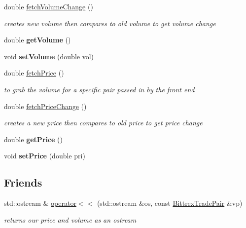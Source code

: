\begin{DoxyCompactItemize}
double \mbox{\hyperlink{class_bittrex_trade_pair_afd555c5ae36025d25964350c50f1006a}{fetch\+Volume\+Change}} ()
\begin{DoxyCompactList}\small\item\em creates new volume then compares to old volume to get volume change \end{DoxyCompactList}\item 
\mbox{\label{class_bittrex_trade_pair_ac3e959d5d6aa90c9126e8f31c1b8d6f8}} 
double {\bfseries get\+Volume} ()
\item 
\mbox{\label{class_bittrex_trade_pair_a40f9c9ff6618e1a170820bd60daeaa0f}} 
void {\bfseries set\+Volume} (double vol)
\item 
double \mbox{\hyperlink{class_bittrex_trade_pair_a74564273a0a56f63a8737fbb4b0dc2e5}{fetch\+Price}} ()
\begin{DoxyCompactList}\small\item\em to grab the volume for a specific pair passed in by the front end \end{DoxyCompactList}\item 
\mbox{\label{class_bittrex_trade_pair_add7f130337294db2b56ce2fbcc669c90}} 
double \mbox{\hyperlink{class_bittrex_trade_pair_add7f130337294db2b56ce2fbcc669c90}{fetch\+Price\+Change}} ()
\begin{DoxyCompactList}\small\item\em creates a new price then compares to old price to get price change \end{DoxyCompactList}\item 
\mbox{\label{class_bittrex_trade_pair_af0a18d8b1cc841b657a474ea071e9778}} 
double {\bfseries get\+Price} ()
\item 
\mbox{\label{class_bittrex_trade_pair_a59673b3475518b65d45651b2a1b0f581}} 
void {\bfseries set\+Price} (double pri)
\end{DoxyCompactItemize}
\subsection*{Friends}
\begin{DoxyCompactItemize}
\item 
\mbox{\label{class_bittrex_trade_pair_a1fc3a2979f802733275f0d907c8ddcb6}} 
std\+::ostream \& \mbox{\hyperlink{class_bittrex_trade_pair_a1fc3a2979f802733275f0d907c8ddcb6}{operator$<$$<$}} (std\+::ostream \&os, const \mbox{\hyperlink{class_bittrex_trade_pair}{Bittrex\+Trade\+Pair}} \&vp)
\begin{DoxyCompactList}\small\item\em returns our price and volume as an ostream \end{DoxyCompactList}\end{DoxyCompactItemize}


